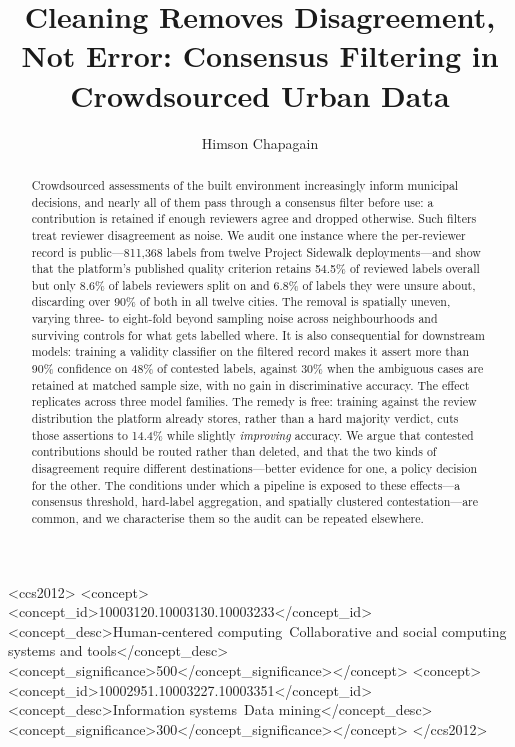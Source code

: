 \documentclass[sigconf]{acmart}
\begin{document}
\title{Cleaning Removes Disagreement, Not Error: Consensus Filtering in
Crowdsourced Urban Data}

\author{Himson Chapagain}

\begin{abstract}
Crowdsourced assessments of the built environment increasingly inform municipal
decisions, and nearly all of them pass through a consensus filter before use: a
contribution is retained if enough reviewers agree and dropped otherwise. Such
filters treat reviewer disagreement as noise. We audit one instance where the
per-reviewer record is public---811{,}368 labels from twelve Project Sidewalk
deployments---and show that the
platform's published quality criterion retains 54.5\% of reviewed labels overall
but only 8.6\% of labels reviewers split on and 6.8\% of labels they were
unsure about, discarding over 90\% of both in all twelve cities. The removal is
spatially uneven, varying three- to eight-fold beyond sampling noise across
neighbourhoods and surviving controls for what gets labelled where. It is also
consequential for downstream models: training a validity classifier on the
filtered record makes it assert more than 90\% confidence on 48\% of contested
labels, against 30\% when the ambiguous cases are retained at matched sample
size, with no gain in discriminative accuracy. The effect replicates across
three model families. The remedy is free: training against the review
distribution the platform already stores, rather than a hard majority verdict,
cuts those assertions to 14.4\% while slightly \emph{improving} accuracy. We
argue that contested contributions should be routed rather than deleted, and
that the two kinds of disagreement require different destinations---better
evidence for one, a policy decision for the other. The conditions under which a
pipeline is exposed to these effects---a consensus threshold, hard-label
aggregation, and spatially clustered contestation---are common, and we
characterise them so the audit can be repeated elsewhere.
\end{abstract}

\begin{CCSXML}
<ccs2012>
<concept><concept_id>10003120.10003130.10003233</concept_id>
<concept_desc>Human-centered computing~Collaborative and social computing systems and tools</concept_desc>
<concept_significance>500</concept_significance></concept>
<concept><concept_id>10002951.10003227.10003351</concept_id>
<concept_desc>Information systems~Data mining</concept_desc>
<concept_significance>300</concept_significance></concept>
</ccs2012>
\end{CCSXML}
\end{document}
